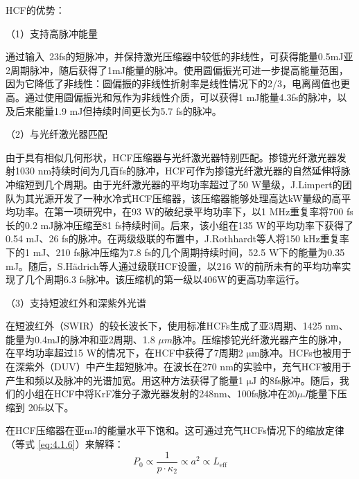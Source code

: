 \documentclass[14pt,a4paper,oneside]{article}
\numberwithin{equation}{subsection}             %
\numberwithin{figure}{subsection}               %
\begin{document}
HCF的优势：

（1）支持高脉冲能量

通过输入~23fs的短脉冲，并保持激光压缩器中较低的非线性，可获得能量0.5mJ亚2周期脉冲\cite{cavalieriIntense5cycleInfrared2007}，随后获得了1mJ能量的脉冲\cite{schweinbergerWaveformcontrolledNearsinglecycleMillijoule2012}。使用圆偏振光可进一步提高能量范围，因为它降低了非线性：圆偏振的非线性折射率是线性情况下的2/3，电离阈值也更高。通过使用圆偏振光和氖作为非线性介质，可以获得1 mJ能量4.3fs的脉冲\cite{chenGeneration43Fs2009}，以及后来能量1.9 mJ但持续时间更长为5.7 fs的脉冲\cite{andersonMultimJCarrierEnvelope2011}。

（2）与光纤激光器匹配

由于具有相似几何形状，HCF压缩器与光纤激光器特别匹配。掺镱光纤激光器发射1030 nm持续时间为几百fs的脉冲，HCF可作为掺镱光纤激光器的自然延伸将脉冲缩短到几个周期。\cite{hadrichHighEnergyUltrashort2009, lavenuHighenergyFewcycleYbdoped2017}由于光纤激光器的平均功率超过了50 W量级，J.Limpert的团队为其光源开发了一种水冷式HCF压缩器，该压缩器能够处理高达kW量级的高平均功率。\cite{hadrichScalabilityComponentsKWlevel2016}在第一项研究中，在93 W的破纪录平均功率下，以1 MHz重复率将700 fs长的0.2 mJ脉冲压缩至81 fs持续时间\cite{rothhardtMHzRepetitionRate2011}。后来，该小组在135 W的平均功率下获得了0.54 mJ、26 fs的脉冲\cite{hadrichNonlinearCompressionSub30fs2013}。在两级级联的布置中，J.Rothhardt等人将150 kHz重复率下的1 mJ、210 fs脉冲压缩为7.8 fs的几个周期持续时间，52.5 W下的能量为0.35 mJ\cite{rothhardt53AveragePower2014}。随后，S.Hädrich等人通过级联HCF设置，以216 W的前所未有的平均功率实现了几个周期6.3 fs脉冲。\cite{hadrichEnergeticSub2cycleLaser2016}该压缩机的第一级以406W的更高功率运行。

（3）支持短波红外和深紫外光谱

在短波红外（SWIR）的较长波长下，使用标准HCFs生成了亚3周期、1425 nm、能量为0.4mJ的脉冲\cite{giguerePulseCompressionSubmillijoule2009}和亚2周期、1.8 $\mu m$脉冲\cite{schmidtCompressionMmLaser2010, schmidtCEPStable162011}。压缩掺铊光纤激光器产生的脉冲，在平均功率超过15 W的情况下，在HCF中获得了7周期2 $\mathrm{\mu m}$脉冲\cite{gebhardtHighAveragePower2017}。HCFs也被用于在深紫外（DUV）中产生超短脉冲。在波长在270 nm的实验中，充气HCF被用于产生和频以及脉冲的光谱加宽\cite{durfeeIntense8fsPulse1999}。用这种方法获得了能量1 $\mathrm{\mu J}$ 的8fs脉冲。随后，我们的小组在HCF中将KrF准分子激光器发射的248nm、100fs脉冲在20$\mu J$能量下压缩到 20fs以下。\cite{steingrubeSub15cyclePulsesSingle2012}

在HCF压缩器在亚mJ的能量水平下饱和。这可通过充气HCFs情况下的缩放定律（等式 \ref{eq:4.1.6}）来解释：
\begin{equation}
    P_0\propto\frac1{p\cdot\kappa_2}\propto a^2\propto L_{\mathrm{eff}}
    \label{eq:4.1.7}
\end{equation}
\end{document}
